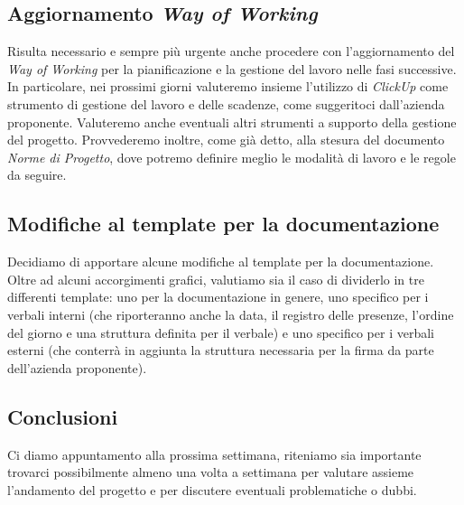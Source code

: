 \documentclass[italian,12pt]{article} %
\begin{document}
\subsection{Aggiornamento \textit{Way of Working}}
Risulta necessario e sempre più urgente anche procedere con l'aggiornamento del
\textit{Way of Working} per la pianificazione e la gestione del lavoro nelle fasi
successive. \\
In particolare, nei prossimi giorni valuteremo insieme l'utilizzo di \textit{ClickUp}
come strumento di gestione del lavoro e delle scadenze, come suggeritoci
dall'azienda proponente. Valuteremo anche eventuali altri strumenti a supporto della
gestione del progetto. Provvederemo inoltre, come già detto, alla stesura del
documento \textit{Norme di Progetto}, dove potremo definire meglio le modalità di
lavoro e le regole da seguire.

\subsection{Modifiche al template per la documentazione}
Decidiamo di apportare alcune modifiche al template per la documentazione. \\
Oltre ad alcuni accorgimenti grafici, valutiamo sia il caso di dividerlo
in tre differenti template: uno per la documentazione in genere, uno specifico per i verbali interni (che riporteranno anche la data, il registro delle presenze, l'ordine del giorno e una struttura definita per il verbale) e uno specifico per i verbali esterni (che conterrà in aggiunta la struttura necessaria per la firma da parte dell'azienda proponente).

\subsection{Conclusioni}
Ci diamo appuntamento alla prossima settimana, riteniamo sia
importante trovarci possibilmente almeno una volta a settimana per valutare assieme
l'andamento del progetto e per discutere eventuali problematiche o dubbi.
\end{document}
